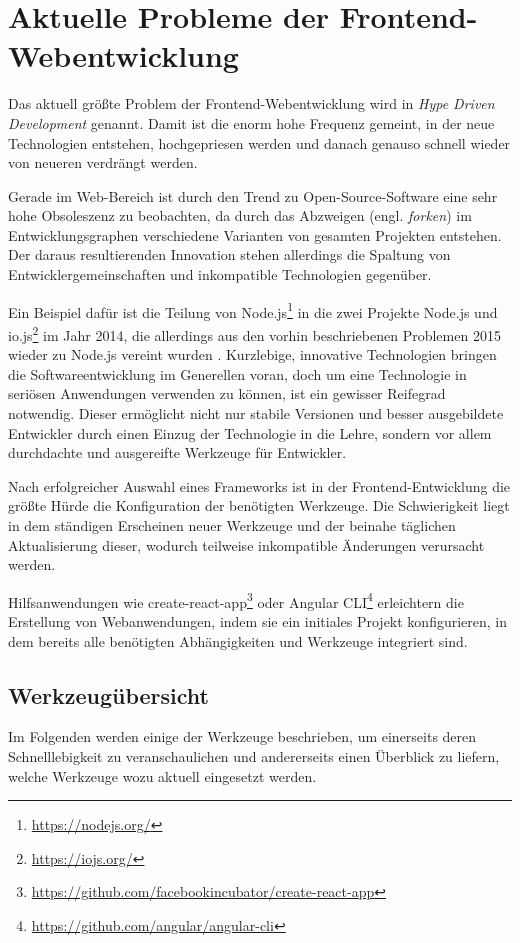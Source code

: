 \chapter{Aktuelle Probleme der Frontend-Webentwicklung}
\label{cha:frontend-problems}

Das aktuell größte Problem der Frontend-Webentwicklung wird in \autocite{Kirejczyk.HDD:online} \emph{Hype Driven Development} genannt.
Damit ist die enorm hohe Frequenz gemeint, in der neue Technologien entstehen, hochgepriesen werden und danach genauso schnell wieder von neueren verdrängt werden.

Gerade im Web-Bereich ist durch den Trend zu Open-Source-Software eine sehr hohe Obsoleszenz zu beobachten, da durch das Abzweigen (engl. \emph{forken}) im Entwicklungsgraphen verschiedene Varianten von gesamten Projekten entstehen.
Der daraus resultierenden Innovation stehen allerdings die Spaltung von Entwicklergemeinschaften und inkompatible Technologien gegenüber.

Ein Beispiel dafür ist die Teilung von Node.js\footnote{\url{https://nodejs.org/}} in die zwei Projekte Node.js und io.js\footnote{\url{https://iojs.org/}} im Jahr 2014, die allerdings aus den vorhin beschriebenen Problemen 2015 wieder zu Node.js vereint wurden \autocite{Node.io-node-merge:online}.
Kurzlebige, innovative Technologien bringen die Softwareentwicklung im Generellen voran, doch um eine Technologie in seriösen Anwendungen verwenden zu können, ist ein gewisser Reifegrad notwendig.
Dieser ermöglicht nicht nur stabile Versionen und besser ausgebildete Entwickler durch einen Einzug der Technologie in die Lehre, sondern vor allem durchdachte und ausgereifte Werkzeuge für Entwickler.

Nach erfolgreicher Auswahl eines Frameworks ist in der Frontend-Entwicklung die größte Hürde die Konfiguration der benötigten Werkzeuge.
Die Schwierigkeit liegt in dem ständigen Erscheinen neuer Werkzeuge und der beinahe täglichen Aktualisierung dieser, wodurch teilweise inkompatible Änderungen verursacht werden.

Hilfsanwendungen wie create-react-app\footnote{\url{https://github.com/facebookincubator/create-react-app}} oder Angular CLI\footnote{\url{https://github.com/angular/angular-cli}} erleichtern die Erstellung von Webanwendungen, indem sie ein initiales Projekt konfigurieren, in dem bereits alle benötigten Abhängigkeiten und Werkzeuge integriert sind.


\section{Werkzeugübersicht}
\label{sec:tools-overview}
Im Folgenden werden einige der Werkzeuge beschrieben, um einerseits deren Schnelllebigkeit zu veranschaulichen und andererseits einen Überblick zu liefern, welche Werkzeuge wozu aktuell eingesetzt werden.

